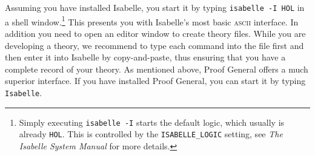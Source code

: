 Assuming you have installed Isabelle, you start it by typing \texttt{isabelle
  -I HOL} in a shell window.\footnote{Simply executing \texttt{isabelle -I}
  starts the default logic, which usually is already \texttt{HOL}.  This is
  controlled by the \texttt{ISABELLE_LOGIC} setting, see \emph{The Isabelle
    System Manual} for more details.} This presents you with Isabelle's most
basic \textsc{ascii} interface.  In addition you need to open an editor window to
create theory files.  While you are developing a theory, we recommend to
type each command into the file first and then enter it into Isabelle by
copy-and-paste, thus ensuring that you have a complete record of your theory.
As mentioned above, Proof General offers a much superior interface.
If you have installed Proof General, you can start it by typing \texttt{Isabelle}.
